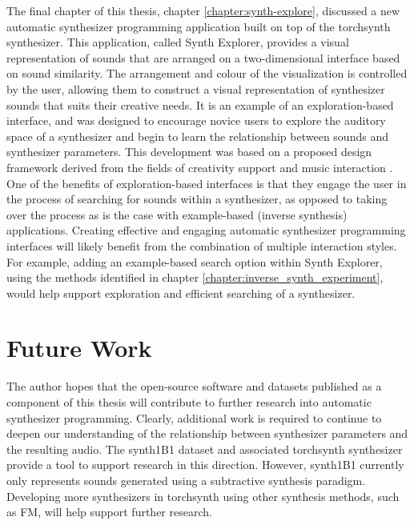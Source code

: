 
The final chapter of this thesis, chapter \ref{chapter:synth-explore}, discussed a new automatic synthesizer programming application built on top of the torchsynth synthesizer. This application, called Synth Explorer, provides a visual representation of sounds that are arranged on a two-dimensional interface based on sound similarity. The arrangement and colour of the visualization is controlled by the user, allowing them to construct a visual representation of synthesizer sounds that suits their creative needs. It is an example of an exploration-based interface, and was designed to encourage novice users to explore the auditory space of a synthesizer and begin to learn the relationship between sounds and synthesizer parameters. This development was based on a proposed design framework derived from the fields of creativity support \cite{shneiderman2007creativity} and music interaction \cite{holland2013music}. One of the benefits of exploration-based interfaces is that they engage the user in the process of searching for sounds within a synthesizer, as opposed to taking over the process as is the case with example-based (inverse synthesis) applications. Creating effective and engaging automatic synthesizer programming interfaces will likely benefit from the combination of multiple interaction styles. For example, adding an example-based search option within Synth Explorer, using the methods identified in chapter \ref{chapter:inverse_synth_experiment}, would help support exploration and efficient searching of a synthesizer.

\section{Future Work}
The author hopes that the open-source software and datasets published as a component of this thesis will contribute to further research into automatic synthesizer programming. Clearly, additional work is required to continue to deepen our understanding of the relationship between synthesizer parameters and the resulting audio. The synth1B1 dataset and associated torchsynth synthesizer provide a tool to support research in this direction. However, synth1B1 currently only represents sounds generated using a subtractive synthesis paradigm. Developing more synthesizers in torchsynth using other synthesis methods, such as FM, will help support further research.

